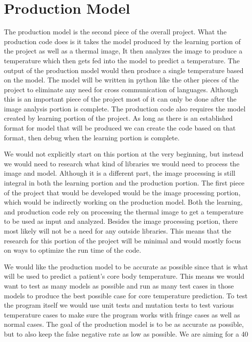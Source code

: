 \documentclass[10pt, draftclsnofoot, onecolumn]{IEEEtran}
\begin{document}
\section{Production Model}
The production model is the second piece of the overall project. What the production code does is it takes the model produced by the learning portion of the project as well as a thermal image, It then analyzes the image to produce a temperature which then gets fed into the model to predict a temperature. The output of the production model would then produce a single temperature based on the model. The model will be written in python like the other pieces of the project to eliminate any need for cross communication of languages. Although this is an important piece of the project most of it can only be done after the image analysis portion is complete. The production code also requires the model created by learning portion of the project. As long as there is an established format for model that will be produced we can create the code based on that format, then debug when the learning portion is complete.

We would not explicitly start on this portion at the very beginning, but instead we would need to research what kind of libraries we would need to process the image and model. Although it is a different part, the image processing is still integral in both the learning portion and the production portion. The first piece of the project that would be developed would be the image processing portion, which would be indirectly working on the production model. Both the learning, and production code rely on processing the thermal image to get a temperature to be used as input and analyzed. Besides the image processing portion, there most likely will not be a need for any outside libraries. This means that the research for this portion of the project will be minimal and would mostly focus on ways to optimize the run time of the code.

We would like the production model to be accurate as possible since that is what will be used to predict a patient's core body temperature. This means we would want to test as many models as possible and run as many test cases in those models to produce the best possible case for core temperature prediction. To test the program itself we would use unit tests and mutation tests to test various temperature cases to make sure the program works with fringe cases as well as normal cases. The goal of the production model is to be as accurate as possible, but to also keep the false negative rate as low as possible. We are aiming for a 40%
\end{document}
